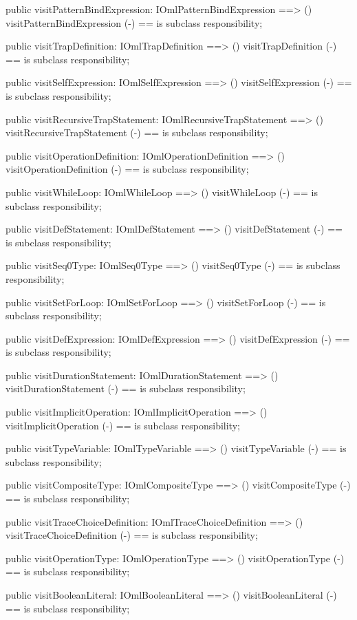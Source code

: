 \begin{vdm_al}
  public visitPatternBindExpression: IOmlPatternBindExpression ==> ()
  visitPatternBindExpression (-) == is subclass responsibility;

  public visitTrapDefinition: IOmlTrapDefinition ==> ()
  visitTrapDefinition (-) == is subclass responsibility;

  public visitSelfExpression: IOmlSelfExpression ==> ()
  visitSelfExpression (-) == is subclass responsibility;

  public visitRecursiveTrapStatement: IOmlRecursiveTrapStatement ==> ()
  visitRecursiveTrapStatement (-) == is subclass responsibility;

  public visitOperationDefinition: IOmlOperationDefinition ==> ()
  visitOperationDefinition (-) == is subclass responsibility;

  public visitWhileLoop: IOmlWhileLoop ==> ()
  visitWhileLoop (-) == is subclass responsibility;

  public visitDefStatement: IOmlDefStatement ==> ()
  visitDefStatement (-) == is subclass responsibility;

  public visitSeq0Type: IOmlSeq0Type ==> ()
  visitSeq0Type (-) == is subclass responsibility;

  public visitSetForLoop: IOmlSetForLoop ==> ()
  visitSetForLoop (-) == is subclass responsibility;

  public visitDefExpression: IOmlDefExpression ==> ()
  visitDefExpression (-) == is subclass responsibility;

  public visitDurationStatement: IOmlDurationStatement ==> ()
  visitDurationStatement (-) == is subclass responsibility;

  public visitImplicitOperation: IOmlImplicitOperation ==> ()
  visitImplicitOperation (-) == is subclass responsibility;

  public visitTypeVariable: IOmlTypeVariable ==> ()
  visitTypeVariable (-) == is subclass responsibility;

  public visitCompositeType: IOmlCompositeType ==> ()
  visitCompositeType (-) == is subclass responsibility;

  public visitTraceChoiceDefinition: IOmlTraceChoiceDefinition ==> ()
  visitTraceChoiceDefinition (-) == is subclass responsibility;

  public visitOperationType: IOmlOperationType ==> ()
  visitOperationType (-) == is subclass responsibility;

  public visitBooleanLiteral: IOmlBooleanLiteral ==> ()
  visitBooleanLiteral (-) == is subclass responsibility;


\end{vdm_al}
